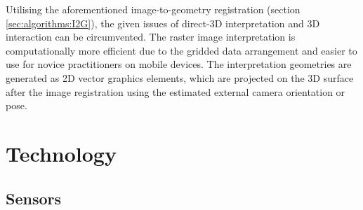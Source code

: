 \documentclass[review]{elsarticle}
\begin{document}
Utilising the aforementioned image-to-geometry registration (section \ref{sec:algorithms:I2G}), the given issues of direct-3D interpretation and 3D interaction can be circumvented. The raster image interpretation is computationally more efficient due to the gridded data arrangement and easier to use for novice practitioners on mobile devices. The interpretation geometries are generated as 2D vector graphics elements, which are projected on the 3D surface after the image registration using the estimated external camera orientation or pose. 


\section{Technology}
\label{sec:technology}

\subsection{Sensors}
\label{sec:technology:sensors}
\end{document}
